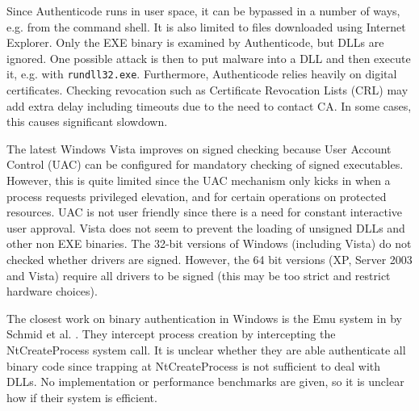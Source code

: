 Since Authenticode runs in user space,
it can be bypassed in a number of ways, e.g. from the command shell.
It is also limited to files downloaded using Internet Explorer.
Only the EXE binary is examined by Authenticode, but DLLs are ignored.
One possible attack is then to put malware into a DLL and then
execute it, e.g. with {\tt rundll32.exe}.
Furthermore, Authenticode relies heavily on digital certificates.
Checking revocation such as Certificate Revocation Lists (CRL) may add extra delay 
including timeouts due to the need to contact CA.
In some cases, this causes significant slowdown.

The latest Windows Vista improves on signed checking
because User Account Control (UAC) can be configured for
mandatory checking of signed executables.
However, this is quite limited since the UAC mechanism only
kicks in when a process requests privileged elevation,
and for certain operations on protected resources.
UAC is not user friendly since there is a need for constant
interactive user approval.
Vista does not seem to prevent the loading of unsigned DLLs and 
other non EXE binaries. 
The 32-bit versions of Windows (including Vista) do not checked whether
drivers are signed.
However, the 64 bit versions (XP, Server 2003 and Vista) require
all drivers to be signed (this may be too strict and restrict hardware choices).

The closest work on binary authentication in Windows is
the Emu system in by Schmid et al. \cite{schmid2001preventing}.
They intercept process creation by intercepting the NtCreateProcess system
call. It is unclear whether they are able authenticate all binary code
since trapping at NtCreateProcess is not sufficient to deal with DLLs.
No implementation or performance benchmarks are given, so it is unclear how 
if their system is efficient.

